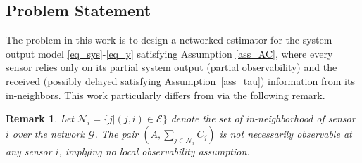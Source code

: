 \documentclass[journal]{IEEEtran}
\newtheorem{rem}{Remark}
\def\mc{\mathcal}
\begin{document}
\subsection{Problem Statement}
The problem in this work is to design a networked estimator for the system-output model \eqref{eq_sys}-\eqref{eq_y} satisfying Assumption \ref{ass_AC},
where every sensor relies only on its partial system output (partial observability) and the received  (possibly delayed satisfying Assumption~\ref{ass_tau}) information from its in-neighbors. This work particularly differs from  \cite{kar2014distributed,sayed-kf,das2016consensus,mohammadi2015distributed,mo2020distributed,jenabzadeh2020distributed,zou2019moving,liu2017distributed} via the following remark.    
\begin{rem} \label{rem_ACj}
Let $\mc{N}_i=\{j|(j,i) \in \mc{E}\}$ denote the set of in-neighborhood of  sensor $i$ over the network $\mc{G}$. The pair $(A, \sum_{j \in \mc{N}_i} C_j)$ is not necessarily observable at any sensor $i$, implying no \textit{local} observability assumption. 
\end{rem}
\end{document}
